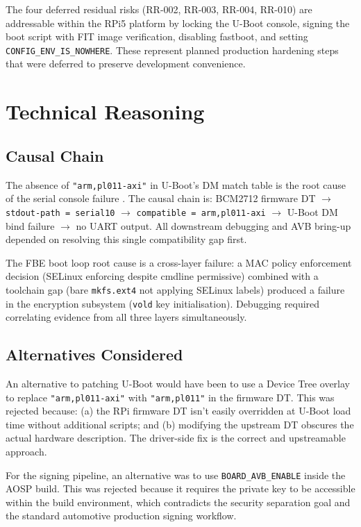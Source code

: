 The four deferred residual risks (RR-002, RR-003, RR-004, RR-010) are addressable within the RPi5 platform by locking the U-Boot console, signing the boot script with FIT image verification, disabling fastboot, and setting \texttt{CONFIG\_ENV\_IS\_NOWHERE}. These represent planned production hardening steps that were deferred to preserve development convenience.

\section{Technical Reasoning}

\subsection{Causal Chain}

The absence of \texttt{"arm,pl011-axi"} in U-Boot's DM match table is the root cause of the serial console failure \cite{dt_spec_chosen}. The causal chain is: BCM2712 firmware DT $\to$ \texttt{stdout-path = serial10} $\to$ \texttt{compatible = arm,pl011-axi} $\to$ U-Boot DM bind failure $\to$ no UART output. All downstream debugging and AVB bring-up depended on resolving this single compatibility gap first.

The FBE boot loop root cause is a cross-layer failure: a MAC policy enforcement decision (SELinux enforcing despite cmdline permissive) combined with a toolchain gap (bare \texttt{mkfs.ext4} not applying SELinux labels) produced a failure in the encryption subsystem (\texttt{vold} key initialisation). Debugging required correlating evidence from all three layers simultaneously.

\subsection{Alternatives Considered}

An alternative to patching U-Boot would have been to use a Device Tree overlay to replace \texttt{"arm,pl011-axi"} with \texttt{"arm,pl011"} in the firmware DT. This was rejected because: (a) the RPi firmware DT isn't easily overridden at U-Boot load time without additional scripts; and (b) modifying the upstream DT obscures the actual hardware description. The driver-side fix is the correct and upstreamable approach.

For the signing pipeline, an alternative was to use \texttt{BOARD\_AVB\_ENABLE} inside the AOSP build. This was rejected because it requires the private key to be accessible within the build environment, which contradicts the security separation goal and the standard automotive production signing workflow.

